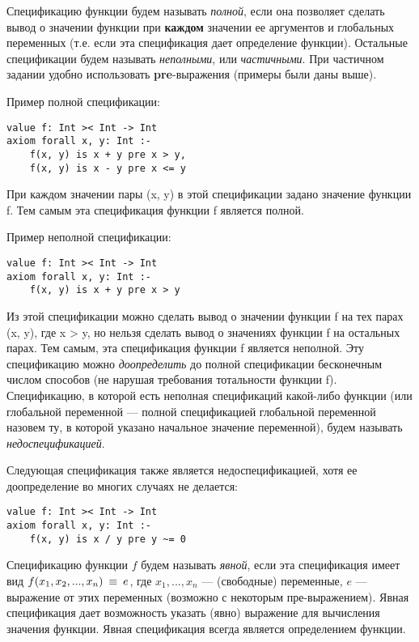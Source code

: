 Спецификацию функции будем называть \emph{полной}, если она позволяет сделать вывод о значении функции при \textbf{каждом} значении ее аргументов и глобальных переменных (т.е. если эта спецификация дает определение функции). Остальные спецификации будем называть \emph{неполными}, или \emph{частичными}. При частичном задании удобно использовать \textbf{pre}-выражения (примеры были даны выше).

Пример полной спецификации:
\begin{lstlisting}
value f: Int >< Int -> Int
axiom forall x, y: Int :-
    f(x, y) is x + y pre x > y,
    f(x, y) is x - y pre x <= y
\end{lstlisting}
При каждом значении пары (x, y) в этой спецификации задано значение функции f. Тем самым эта спецификация функции f является полной.

Пример неполной спецификации:
\begin{lstlisting}
value f: Int >< Int -> Int
axiom forall x, y: Int :-
    f(x, y) is x + y pre x > y
\end{lstlisting}
Из этой спецификации можно сделать вывод о значении функции f на тех парах (x, y), где x > y, но нельзя сделать вывод  о значениях функции f на остальных парах. Тем самым, эта спецификация функции f является неполной. Эту спецификацию можно \emph{доопределить} до полной спецификации бесконечным числом способов (не нарушая требования тотальности функции f). Спецификацию, в которой есть неполная спецификаций какой-либо функции (или глобальной переменной --- полной спецификацией глобальной переменной назовем ту, в которой указано начальное значение переменной), будем называть \emph{недоспецификацией}.

Следующая спецификация также является недоспецификацией, хотя ее доопределение во многих случаях не делается:
\begin{lstlisting}
value f: Int >< Int -> Int
axiom forall x, y: Int :-
    f(x, y) is x / y pre y ~= 0
\end{lstlisting}



Спецификацию функции $f$ будем называть \emph{явной}, если эта спецификация имеет вид $f(x_1, x_2, ..., x_n) ~\mathop{\equiv}~ e$, где $x_1, ..., x_n$ --- (свободные) переменные, $e$ --- выражение от этих переменных (возможно с некоторым пре-выражением). Явная спецификация дает возможность указать (явно) выражение для вычисления значения функции. Явная спецификация всегда является определением функции.

